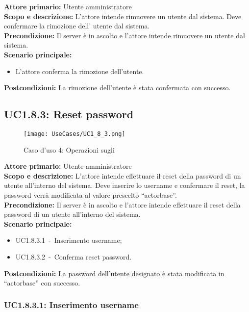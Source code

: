 \documentclass{scalatekids-article}
\begin{document}
\textbf{Attore primario:} Utente amministratore\\
\textbf{Scopo e descrizione:} L'attore intende rimuovere un utente dal sistema. Deve confermare la rimozione dell' utente dal sistema.\\
\textbf{Precondizione:} Il server è in ascolto e l'attore intende rimuovere un utente dal sistema.\\
\textbf{Scenario principale:}
\begin{itemize}
\item L'attore conferma la rimozione dell'utente.
\end{itemize}
\textbf{Postcondizioni:} La rimozione dell'utente è stata confermata con successo.

\subsection{UC1.8.3: Reset password}

\begin{figure}[H]
  \begin{center}
    \texttt{[image: UseCases/UC1\_8\_3.png]}
    \caption{Caso d'uso 4: Operazioni sugli }
  \end{center}
\end{figure}
\textbf{Attore primario:} Utente amministratore\\
\textbf{Scopo e descrizione:} L'attore intende effettuare il reset della password di un utente all'interno del sistema. Deve inserire lo username e confermare il reset, la password
verrà modificata al valore prescelto ``actorbase''.\\
\textbf{Precondizione:} Il server è in ascolto e l'attore intende effettuare il reset della password di un utente all'interno del sistema.\\
\textbf{Scenario principale:}
\begin{itemize}
\item UC1.8.3.1\ -\ Inserimento username;
\item UC1.8.3.2\ -\ Conferma reset password.
\end{itemize}
\textbf{Postcondizioni:} La password dell'utente designato è stata modificata in ``actorbase'' con successo.

\subsubsection{UC1.8.3.1: Inserimento username}
\end{document}
